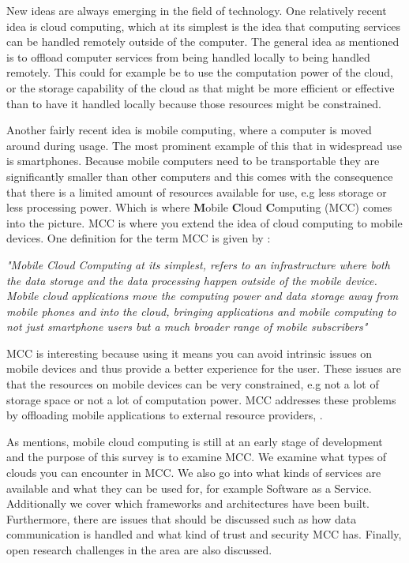 New ideas are always emerging in the field of technology.
One relatively recent idea is cloud computing, which at its simplest is the idea that computing services can be handled remotely outside of the computer. 
The general idea as mentioned is to offload computer services from being handled locally to being handled remotely. 
This could for example be to use the computation power of the cloud, or the storage capability of the cloud as that might be more efficient or effective than to have it handled locally because those resources might be constrained.

Another fairly recent idea is mobile computing, where a computer is moved around during usage.
The most prominent example of this that in widespread use is smartphones.
Because mobile computers need to be transportable they are significantly smaller than other computers and this comes with the consequence that there is a limited amount of resources available for use, e.g less storage or less processing power.
Which is where \textbf{M}obile \textbf{C}loud \textbf{C}omputing (MCC) comes into the picture. 
MCC is where you extend the idea of cloud computing to mobile devices.
One definition for the term MCC is given by \citet{article:mobilecloudreviewinderkildesecurity}:

\textit{"Mobile Cloud Computing at its simplest, refers to an infrastructure where both the data storage and the data processing happen outside of the mobile device. Mobile cloud applications move the computing power and data storage away from mobile phones and into the cloud, bringing applications and mobile computing to not just smartphone users but a much broader range of mobile subscribers"}

MCC is interesting because using it means you can avoid intrinsic issues on mobile devices and thus provide a better experience for the user. 
These issues are that the resources on mobile devices can be very constrained, e.g not a lot of storage space or not a lot of computation power.
MCC addresses these problems by offloading mobile applications to external resource providers, \citet{fernando2013mobile}.

As \citet{6215350} mentions, mobile cloud computing is still at an early stage of development and the purpose of this survey is to examine MCC. 
We examine what types of clouds you can encounter in MCC.
We also go into what kinds of services are available and what they can be used for, for example Software as a Service.
Additionally we cover which frameworks and architectures have been built. 
Furthermore, there are issues that should be discussed such as how data communication is handled and what kind of trust and security MCC has. 
Finally, open research challenges in the area are also discussed. 